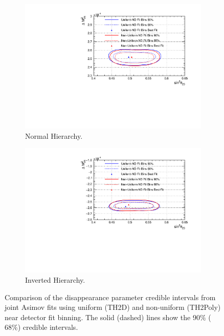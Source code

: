 \begin{figure}[!htbp]
\centering
\begin{subfigure}{.7\textwidth}
  \centering
  \includegraphics[width=0.95\linewidth]{figs/compMaCh3Contours_TH2DvsTHPoly_asimov/compMaCh3Contours_TH2DvsTHPoly_disapp_asimovA_NH}
  \caption{Normal Hierarchy.}
  \label{fig:TH2DPolyDisNH}
\end{subfigure}
\begin{subfigure}{.7\textwidth}
  \centering
  \includegraphics[width=0.95\linewidth]{figs/compMaCh3Contours_TH2DvsTHPoly_asimov/compMaCh3Contours_TH2DvsTHPoly_disapp_asimovA_IH}
  \caption{Inverted Hierarchy.}
  \label{fig:TH2DPolyDisIH}
\end{subfigure}
\caption{Comparison of the disappearance parameter credible intervals from joint Asimov fits using uniform (TH2D) and non-uniform (TH2Poly) near detector fit binning. The solid (dashed) lines show the 90$\%$ ($68\%$) credible intervals.}
\label{fig:TH2DPolyDis}
\end{figure}

